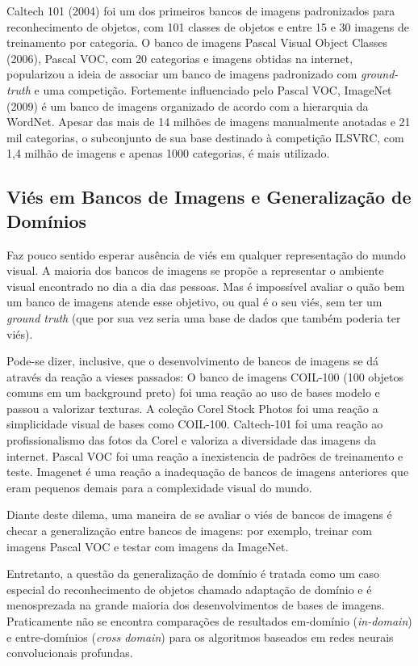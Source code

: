 \documentclass[conference]{IEEEtran}
\begin{document}
Caltech 101 (2004)\cite{caltech} foi um dos primeiros bancos de imagens padronizados para reconhecimento de objetos, com 101 classes de objetos e entre 15 e 30 imagens de treinamento por categoria. O banco de imagens Pascal Visual Object Classes (2006)\cite{pascal}, Pascal VOC, com 20 categorias e imagens obtidas na internet, popularizou a ideia de associar um banco de imagens padronizado com \textit{ground-truth} e uma competição. Fortemente influenciado pelo Pascal VOC, ImageNet (2009) \cite{imagenet} é um banco de imagens organizado de acordo com a hierarquia da WordNet\cite{wordnet}. Apesar das mais de 14 milhões de imagens manualmente anotadas e 21 mil categorias, o subconjunto de sua base destinado à competição ILSVRC, com 1,4 milhão de imagens e apenas 1000 categorias, é mais utilizado. 

\subsection{Viés em Bancos de Imagens e Generalização de Domínios}

Faz pouco sentido esperar ausência de viés em qualquer representação do mundo visual. A maioria dos bancos de imagens se propõe a representar o ambiente visual encontrado no dia a dia das pessoas. Mas é impossível avaliar o quão bem um banco de imagens atende esse objetivo, ou qual é o seu viés, sem ter um \textit{ground truth} (que por sua vez seria uma base de dados que também poderia ter viés)\cite{bias}. 

Pode-se dizer, inclusive, que o desenvolvimento de bancos de imagens se dá através da reação a vieses passados: O banco de imagens COIL-100 (100 objetos comuns em um background preto) foi uma reação ao uso de bases modelo e passou a valorizar texturas. A coleção Corel Stock Photos foi uma reação a simplicidade visual de bases como COIL-100. Caltech-101 foi uma reação ao profissionalismo das fotos da Corel e valoriza a diversidade das imagens da internet. Pascal VOC foi uma reação a inexistencia de padrões de treinamento e teste. Imagenet é uma reação a inadequação de bancos de imagens anteriores que eram pequenos demais para a complexidade visual do mundo\cite{bias}.

Diante deste dilema, uma maneira de se avaliar o viés de bancos de imagens é checar a generalização entre bancos de imagens: por exemplo, treinar com imagens Pascal VOC e testar com imagens da ImageNet\cite{bias}.

Entretanto, a questão da generalização de domínio é tratada como um caso especial do reconhecimento de objetos chamado adaptação de domínio e é menosprezada na grande maioria dos desenvolvimentos de bases de imagens. Praticamente não se encontra comparações de resultados em-domínio (\textit{in-domain}) e entre-domínios (\textit{cross domain}) para os algoritmos baseados em redes neurais convolucionais profundas. 
\end{document}
